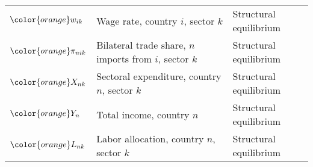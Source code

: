 \begin{table}[H]
{\begin{tabular}{>{\raggedright}p{2cm} >{\raggedright}p{7cm} >{\raggedright\arraybackslash}p{6cm}}
${\color{orange}w_{ik}}$ & Wage rate, country $i$, sector $k$ & Structural equilibrium \\
${\color{orange}\pi_{nik}}$ & Bilateral trade share, $n$ imports from $i$, sector $k$ & Structural equilibrium \\
${\color{orange}X_{nk}}$ & Sectoral expenditure, country $n$, sector $k$ & Structural equilibrium \\
${\color{orange}Y_{n}}$ & Total income, country $n$ & Structural equilibrium \\
${\color{orange}L_{nk}}$ & Labor allocation, country $n$, sector $k$ & Structural equilibrium \\
\bottomrule
\end{tabular}%
}
\end{table}
